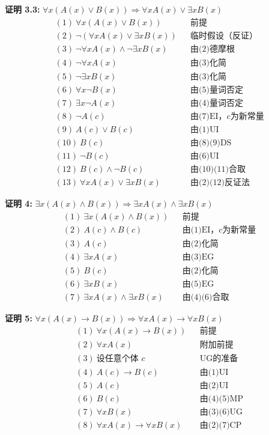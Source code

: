 \documentclass[lang=cn,11pt]{elegantbook}
\begin{document}
\noindent
\textbf{证明 3.3:} $\forall x(A(x)\lor B(x))\Rightarrow \forall xA(x)\lor \exists xB(x)$
\vspace{-10pt}
\begin{align*}
&(1)\ \forall x(A(x)\lor B(x)) && \text{前提} \\
&(2)\ \neg(\forall xA(x) \lor \exists xB(x)) && \text{临时假设（反证）} \\
&(3)\ \neg\forall xA(x) \land \neg\exists xB(x) && \text{由(2)德摩根} \\
&(4)\ \neg\forall xA(x) && \text{由(3)化简} \\
&(5)\ \neg\exists xB(x) && \text{由(3)化简} \\
&(6)\ \forall x\neg B(x) && \text{由(5)量词否定} \\
&(7)\ \exists x\neg A(x) && \text{由(4)量词否定} \\
&(8)\ \neg A(c) && \text{由(7)EI，$c$为新常量} \\
&(9)\ A(c) \lor B(c) && \text{由(1)UI} \\
&(10)\ B(c) && \text{由(8)(9)DS} \\
&(11)\ \neg B(c) && \text{由(6)UI} \\
&(12)\ B(c) \land \neg B(c) && \text{由(10)(11)合取} \\
&(13)\ \forall xA(x) \lor \exists xB(x) && \text{由(2)(12)反证法}
\end{align*}

\noindent
\textbf{证明 4:} $\exists x(A(x)\land B(x))\Rightarrow \exists xA(x)\land \exists xB(x)$
\vspace{-10pt}
\begin{align*}
&(1)\ \exists x(A(x)\land B(x)) && \text{前提} \\
&(2)\ A(c) \land B(c) && \text{由(1)EI，$c$为新常量} \\
&(3)\ A(c) && \text{由(2)化简} \\
&(4)\ \exists xA(x) && \text{由(3)EG} \\
&(5)\ B(c) && \text{由(2)化简} \\
&(6)\ \exists xB(x) && \text{由(5)EG} \\
&(7)\ \exists xA(x) \land \exists xB(x) && \text{由(4)(6)合取}
\end{align*}

\noindent
\textbf{证明 5:} $\forall x(A(x)\to B(x))\Rightarrow \forall xA(x)\to \forall xB(x)$
\vspace{-10pt}
\begin{align*}
&(1)\ \forall x(A(x)\to B(x)) && \text{前提} \\
&(2)\ \forall xA(x) && \text{附加前提} \\
&(3)\ \text{设任意个体 $c$} && \text{UG的准备} \\
&(4)\ A(c) \to B(c) && \text{由(1)UI} \\
&(5)\ A(c) && \text{由(2)UI} \\
&(6)\ B(c) && \text{由(4)(5)MP} \\
&(7)\ \forall xB(x) && \text{由(3)(6)UG} \\
&(8)\ \forall xA(x) \to \forall xB(x) && \text{由(2)(7)CP}
\end{align*}
\end{document}
